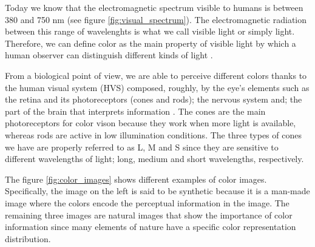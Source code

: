 Today we know that the electromagnetic spectrum visible to humans is between 380 and 750 nm (see figure \ref{fig:visual_spectrum}). The electromagnetic radiation between this range of wavelenghts is what we call visible light or simply light. Therefore, we can define color as the main property of visible light by which a human observer can distinguish different kinds of light \citep{Kerr:Online:2003}.

From a biological point of view, we are able to perceive different colors thanks to the human visual system (HVS) composed, roughly, by the eye's elements such as the retina and its photoreceptors (cones and rods); the nervous system and; the part of the brain that interprets information \citep{Fairchild:Book:2005}. The cones are the main photoreceptors for color vison because they work when more light is available, whereas rods are active in low illumination conditions. The three types of cones we have are properly referred to as L, M and S since they are sensitive to different wavelengths of light; long, medium and short wavelengths, respectively.

The figure \ref{fig:color_images} shows different examples of color images. Specifically, the image on the left is said to be synthetic because it is a man-made image where the colors encode the perceptual information in the image. The remaining three images are natural images that show the importance of color information since many elements of nature have a specific color representation distribution.

